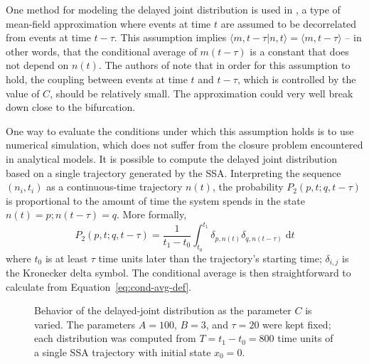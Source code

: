 \documentclass[english,letterpaper,12pt]{report}
\newcommand{\dee}{\;\mathrm{d}}
\begin{document}
\begin{doublespacing}
One method for modeling the delayed joint distribution is used in \cite{delay-oscillations}, a type of mean-field approximation where events at time $t$ are assumed to be decorrelated from events at time $t - \tau$. This assumption implies $\langle m, t - \tau | n, t \rangle = \langle m, t - \tau \rangle$ -- in other words, that the conditional average of $m(t - \tau)$ is a constant that does not depend on $n(t)$. The authors of \cite{delay-oscillations} note that in order for this assumption to hold, the coupling between events at time $t$ and $t - \tau$, which is controlled by the value of $C$, should be relatively small. The approximation could very well break down close to the bifurcation.

One way to evaluate the conditions under which this assumption holds is to use numerical simulation, which does not suffer from the closure problem encountered in analytical models. It is possible to compute the delayed joint distribution based on a single trajectory generated by the SSA. Interpreting the sequence $(n_i, t_i)$ as a continuous-time trajectory $n(t)$, the probability $P_2(p, t; q, t - \tau)$ is proportional to the amount of time the system spends in the state $n(t) = p; n(t - \tau) = q$. More formally,
\begin{equation}
    P_2(p, t; q, t - \tau) = \frac{1}{t_1 - t_0} \int_{t_0}^{t_1} \delta_{p, n(t)} \delta_{q, n(t - \tau)} \dee t
    \label{eq:joint-pdist-calc}
\end{equation}
where $t_0$ is at least $\tau$ time units later than the trajectory's starting time; $\delta_{i,j}$ is the Kronecker delta symbol. The conditional average is then straightforward to calculate from Equation~\eqref{eq:cond-avg-def}.

\begin{figure}[htb]
    \caption{Behavior of the delayed-joint distribution as the parameter $C$ is varied. The parameters $A=100$, $B=3$, and $\tau=20$ were kept fixed; each distribution was computed from $T = t_1 - t_0 = 800$ time units of a single SSA trajectory with initial state $x_0 = 0$.}
    \label{fig:ddjd-sweep}
\end{figure}


\end{doublespacing}
\end{document}
